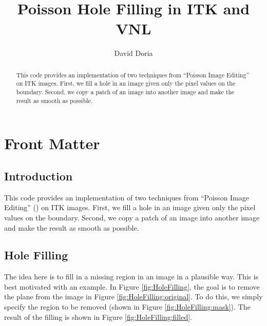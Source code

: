 \documentclass{InsightArticle}
\title{Poisson Hole Filling in ITK and VNL}
\author{David Doria}
\newcommand{\IJhandlerIDnumber}{3253}
\begin{document}
%
% 
\IJhandlefooter{\IJhandlerIDnumber}


\ifpdf
\else
\fi


\maketitle


\ifhtml
\chapter*{Front Matter\label{front}}
\fi


\begin{abstract}
\noindent
This code provides an implementation of two techniques from ``Poisson Image Editing'' on ITK images. First, we fill a hole in an image given only the pixel values on the boundary. Second, we copy a patch of an image into another image and make the result as smooth as possible.

\end{abstract}

\IJhandlenote{\IJhandlerIDnumber}

\tableofcontents

\section{Introduction}
This code provides an implementation of two techniques from ``Poisson Image Editing'' (\cite{PoissonImageEditing}) on ITK images. First, we fill a hole in an image given only the pixel values on the boundary. Second, we copy a patch of an image into another image and make the result as smooth as possible.

\section{Hole Filling}
The idea here is to fill in a missing region in an image in a plausible way. This is best motivated with an example. In Figure \ref{fig:HoleFilling}, the goal is to remove the plane from the image in Figure \ref{fig:HoleFilling:original}. To do this, we simply specify the region to be removed (shown in Figure \ref{fig:HoleFilling:mask}). The result of the filling is shown in Figure \ref{fig:HoleFilling:filled}.
\end{document}
